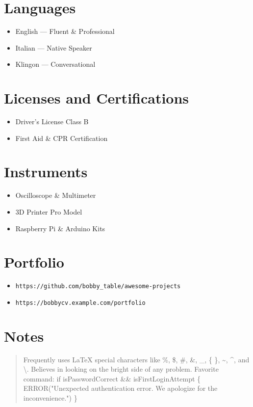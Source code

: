 \documentclass[a4paper,11pt]{article}
\begin{document}
\section*{Languages}
\begin{itemize}

  \item English — Fluent \& Professional

  \item Italian — Native Speaker

  \item Klingon — Conversational

\end{itemize}

\section*{Licenses and Certifications}
\begin{itemize}

  \item Driver’s License Class B

  \item First Aid \& CPR Certification

\end{itemize}

\section*{Instruments}
\begin{itemize}

  \item Oscilloscope \& Multimeter

  \item 3D Printer Pro Model

  \item Raspberry Pi \& Arduino Kits

\end{itemize}

\section*{Portfolio}
\begin{itemize}

  \item \texttt{\small https://github.com/bobby\_table/awesome-projects}

  \item \texttt{\small https://bobbycv.example.com/portfolio}

\end{itemize}

\section*{Notes}
\begin{quote}
Frequently uses LaTeX special characters like \%, \$, \#, \&, \_, \{ \}, \textasciitilde{}, \textasciicircum{}, and \textbackslash{}.
Believes in looking on the bright side of any problem.
Favorite command: if isPasswordCorrect \&\& isFirstLoginAttempt \{ ERROR("Unexpected authentication error. We apologize for the inconvenience.") \}

\end{quote}
\end{document}
